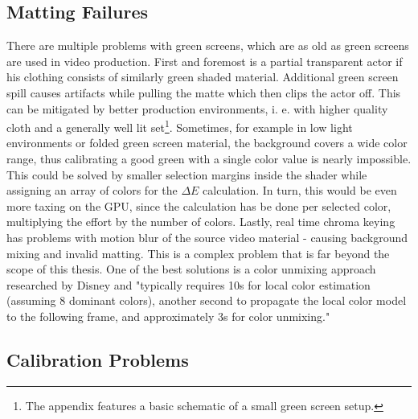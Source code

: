 \subsection{Matting Failures}

There are multiple problems with green screens, which are as old as green 
screens are used in video production. First and foremost is a partial 
transparent actor if his clothing consists of similarly green shaded material.
\newline
Additional green screen spill causes artifacts while pulling the matte which 
then clips the actor off. This can be mitigated by better production 
environments, i. e. with higher quality cloth and a generally well lit 
set\footnote{The appendix features a basic schematic of a small green screen 
setup.}.
\newline
Sometimes, for example in low light environments or folded green screen 
material, the background covers a wide color range, thus calibrating a good 
green with a single color value is nearly impossible. This could be solved by 
smaller selection margins inside the shader while assigning an array of colors 
for the $\Delta E$ calculation. In turn, this would be even more taxing on the 
GPU, since the calculation has be done per selected color, multiplying the 
effort by the number of colors.
\newline
Lastly, real time chroma keying has problems with motion blur of the source 
video material - causing background mixing and invalid matting. This is a 
complex problem that is far beyond the scope of this thesis. One of the best 
solutions is a color unmixing approach researched by Disney and "typically 
requires 10s for local color estimation (assuming 8 dominant colors), another 
second to propagate the local color model to the following frame, and 
approximately 3s for color unmixing." \cite{disney:unmixing:2017}

\subsection{Calibration Problems}

